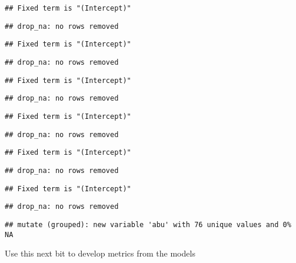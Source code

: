 \documentclass[
]{article}
\begin{document}
\begin{verbatim}
## Fixed term is "(Intercept)"
\end{verbatim}

\begin{verbatim}
## drop_na: no rows removed
\end{verbatim}

\begin{verbatim}
## Fixed term is "(Intercept)"
\end{verbatim}

\begin{verbatim}
## drop_na: no rows removed
\end{verbatim}

\begin{verbatim}
## Fixed term is "(Intercept)"
\end{verbatim}

\begin{verbatim}
## drop_na: no rows removed
\end{verbatim}

\begin{verbatim}
## Fixed term is "(Intercept)"
\end{verbatim}

\begin{verbatim}
## drop_na: no rows removed
\end{verbatim}

\begin{verbatim}
## Fixed term is "(Intercept)"
\end{verbatim}

\begin{verbatim}
## drop_na: no rows removed
\end{verbatim}

\begin{verbatim}
## Fixed term is "(Intercept)"
\end{verbatim}

\begin{verbatim}
## drop_na: no rows removed
\end{verbatim}

\begin{verbatim}
## mutate (grouped): new variable 'abu' with 76 unique values and 0% NA
\end{verbatim}

Use this next bit to develop metrics from the models
\end{document}

